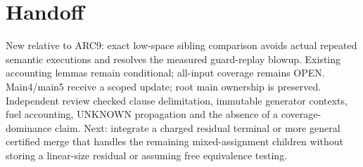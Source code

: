 \documentclass[11pt]{article}
\begin{document}
\section{Handoff}
New relative to ARC9: exact low-space sibling comparison avoids actual repeated
semantic executions and resolves the measured guard-replay blowup. Existing
accounting lemmas remain conditional; all-input coverage remains OPEN.
Main4/main5 receive a scoped update; root main ownership is preserved.
Independent review checked clause delimitation, immutable generator contexts,
fuel accounting, UNKNOWN propagation and the absence of a coverage-dominance
claim. Next: integrate a charged residual terminal or more general certified
merge that handles the remaining mixed-assignment children without storing
a linear-size residual or assuming free equivalence testing.
\end{document}
